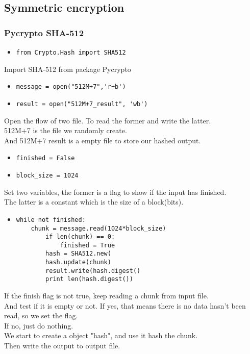 \documentclass{article}
\begin{document}
\subsection{Symmetric encryption}

\subsubsection{Pycrypto SHA-512}

\begin{itemize}
\item \verb|from Crypto.Hash import SHA512|
\end{itemize}

\noindent Import SHA-512 from package Pycrypto

\begin{itemize}
\item \verb|message = open("512M+7",'r+b')|
\item \verb|result = open("512M+7_result", 'wb')|
\end{itemize}
 
\noindent Open the flow of two file. To read the former and write the latter.\\
512M+7 is the file we randomly create.\\
And 512M+7 result is a empty file to store our hashed output.

\begin{itemize}
\item \verb|finished = False|
\item \verb|block_size = 1024|
\end{itemize}

\noindent Set two variables, the former is a flag to show if the input has finished.\\
The latter is a constant which is the size of a block(bits).

\begin{itemize}
\item \begin{verbatim}while not finished:
    chunk = message.read(1024*block_size)
	    if len(chunk) == 0:
	        finished = True
	    hash = SHA512.new(
	    hash.update(chunk)
	    result.write(hash.digest()
	    print len(hash.digest())
\end{verbatim}
\end{itemize}

\noindent If the finish flag is not true, keep reading a chunk from input file.\\
And test if it is empty or not. If yes, that means there is no data hasn't been read, so we set the flag.\\
If no, just do nothing.\\
We start to create a object "hash", and use it hash the chunk.\\
Then write the output to output file.
\end{document}
